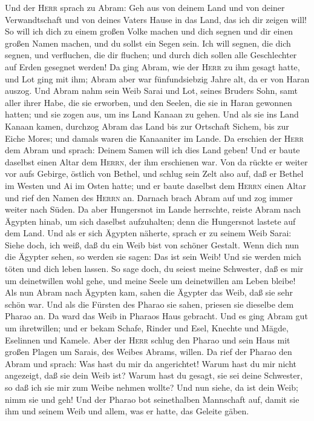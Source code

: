  Und der \textsc{Herr} sprach zu Abram: Geh aus von deinem
Land und von deiner Verwandtschaft und von deines Vaters Hause in das
Land, das ich dir zeigen will!  So will ich dich zu einem
großen Volke machen und dich segnen und dir einen großen Namen machen,
und du sollst ein Segen sein.  Ich will segnen, die dich
segnen, und verfluchen, die dir fluchen; und durch dich sollen alle
Geschlechter auf Erden gesegnet werden!  Da ging Abram,
wie der \textsc{Herr} zu ihm gesagt hatte, und Lot ging mit ihm; Abram
aber war fünfundsiebzig Jahre alt, da er von Haran auszog.
 Und Abram nahm sein Weib Sarai und Lot, seines Bruders
Sohn, samt aller ihrer Habe, die sie erworben, und den Seelen, die sie
in Haran gewonnen hatten; und sie zogen aus, um ins Land Kanaan zu
gehen.  Und als sie ins Land Kanaan kamen, durchzog Abram
das Land bis zur Ortschaft Sichem, bis zur Eiche Mores; und damals waren
die Kanaaniter im Lande.  Da erschien der \textsc{Herr}
dem Abram und sprach: Deinem Samen will ich dies Land geben! Und er
baute daselbst einen Altar dem \textsc{Herrn}, der ihm erschienen war.
 Von da rückte er weiter vor aufs Gebirge, östlich von
Bethel, und schlug sein Zelt also auf, daß er Bethel im Westen und Ai im
Osten hatte; und er baute daselbst dem \textsc{Herrn} einen Altar und
rief den Namen des \textsc{Herrn} an.  Darnach brach Abram
auf und zog immer weiter nach Süden.  Da aber Hungersnot
im Lande herrschte, reiste Abram nach Ägypten hinab, um sich daselbst
aufzuhalten; denn die Hungersnot lastete auf dem Land. 
Und als er sich Ägypten näherte, sprach er zu seinem Weib Sarai: Siehe
doch, ich weiß, daß du ein Weib bist von schöner Gestalt.
 Wenn dich nun die Ägypter sehen, so werden sie sagen:
Das ist sein Weib! Und sie werden mich töten und dich leben lassen.
 So sage doch, du seiest meine Schwester, daß es mir um
deinetwillen wohl gehe, und meine Seele um deinetwillen am Leben bleibe!
 Als nun Abram nach Ägypten kam, sahen die Ägypter das
Weib, daß sie sehr schön war.  Und als die Fürsten des
Pharao sie sahen, priesen sie dieselbe dem Pharao an. Da ward das Weib
in Pharaos Haus gebracht.  Und es ging Abram gut um
ihretwillen; und er bekam Schafe, Rinder und Esel, Knechte und Mägde,
Eselinnen und Kamele.  Aber der \textsc{Herr} schlug den
Pharao und sein Haus mit großen Plagen um Sarais, des Weibes Abrams,
willen.  Da rief der Pharao den Abram und sprach: Was
hast du mir da angerichtet! Warum hast du mir nicht angezeigt, daß sie
dein Weib ist?  Warum hast du gesagt, sie sei deine
Schwester, so daß ich sie mir zum Weibe nehmen wollte? Und nun siehe, da
ist dein Weib; nimm sie und geh!  Und der Pharao bot
seinethalben Mannschaft auf, damit sie ihm und seinem Weib und allem,
was er hatte, das Geleite gäben.

